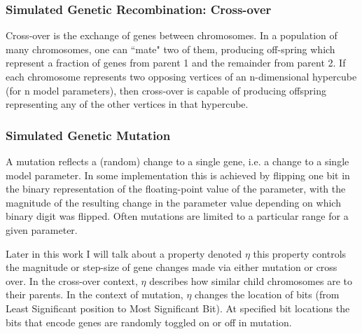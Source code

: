 \subsubsection{Simulated Genetic Recombination: Cross-over}
Cross-over is the exchange of genes between chromosomes.  In a population of many chromosomes, one can ``mate" two of them, producing off-spring which represent a fraction of genes from parent 1 and the remainder from parent 2.  If each chromosome represents two opposing vertices of an n-dimensional hypercube (for n model parameters), then cross-over is capable of producing offspring representing any of the other vertices in that hypercube.
\subsubsection{Simulated Genetic Mutation}
A mutation reflects a (random) change to a single gene, i.e. a change to a single model parameter.  In some implementation this is achieved by flipping one bit in the binary representation of the floating-point value of the parameter, with the magnitude of the resulting change in the parameter value depending on which binary digit was flipped.  Often mutations are limited to a particular range for a given parameter.

Later in this work I will talk about a property denoted $\eta$ this property controls the magnitude or step-size of gene changes made via either mutation or cross over. In the cross-over context, $\eta$ describes how similar child chromosomes are to their parents. In the context of mutation, $\eta$ changes the location of bits (from Least Significant position to Most Significant Bit). At specified bit locations the bits that encode genes are randomly toggled on or off in mutation.

